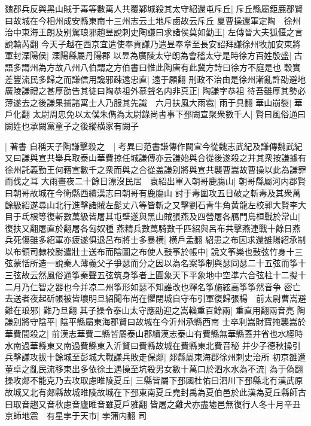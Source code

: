 魏郡兵反與黑山賊于毒等數萬人共覆鄴城殺其太守紹還屯斥丘|{
	斥丘縣屬鉅鹿郡賢曰故城在今相州成安縣東南十三州志云土地斥鹵故云斥丘}
夏曹操還軍定陶　徐州治中東海王朗及别駕琅邪趙昱說刺史陶謙曰求諸侯莫如勤王|{
	左傳晉大夫狐偃之言說輸芮翻}
今天子越在西京宜遣使奉貢謙乃遣昱奉章至長安詔拜謙徐州牧加安東將軍封溧陽侯|{
	溧陽縣屬丹陽郡}
以昱為廣陵太守朗為會稽太守是時徐方百姓殷盛|{
	古語多謂州為方故八州八伯謂之方伯書曰惟此陶唐有此冀方詩曰徐方不庭是也}
穀實差豐流民多歸之而謙信用讒邪疎遠忠直|{
	遠于願翻}
刑政不治由是徐州漸亂許劭避地廣陵謙禮之甚厚劭告其徒曰陶恭祖外慕聲名内非真正|{
	陶謙字恭祖}
待吾雖厚其勢必薄遂去之後謙果捕諸寓士人乃服其先識　六月扶風大雨雹|{
	雨于具翻}
華山崩裂|{
	華戶化翻}
太尉周忠免以太僕朱儁為太尉錄尚書事下邳闕宣聚衆數千人|{
	賢曰風俗通曰闕姓也承闕黨童子之後縱横家有闕子}


|{
	著書}
自稱天子陶謙擊殺之　|{
	考異曰范書謙傳作闕宣今從魏志武紀及謙傳魏武紀又曰謙與宣共舉兵取泰山華費掠任城謙傳亦云謙始與合從後遂殺之并其衆按謙據有徐州託義勤王何藉宣數千之衆而與之合從盖謙别將與宣共襲曹嵩故曹操以此為謙罪而伐之耳}
大雨晝夜二十餘日漂沒民居　袁紹出軍入朝哥鹿膓山|{
	朝哥縣屬河内郡賢曰朝哥故城在今衛縣西續漢志曰朝哥有鹿膓山}
討于毒圍攻五日破之斬毒及其衆萬餘級紹遂尋山北行進擊諸賊左髭丈八等皆斬之又擊劉石青牛角黄龍左校郭大賢李大目于氐根等復斬數萬級皆屠其屯壁遂與黑山賊張燕及四營屠各鴈門烏桓戰於常山|{
	復扶又翻屠直於翻屠各匈奴種}
燕精兵數萬騎數千匹紹與呂布共擊燕連戰十餘日燕兵死傷雖多紹軍亦疲遂俱退呂布將士多暴横|{
	横戶孟翻}
紹患之布因求還雒陽紹承制以布領司隸校尉遣壯士送布而陰圖之布使人鼓筝於帳中|{
	說文筝樂也鼔弦竹身十三弦蒙恬所造一說秦人薄義父子爭瑟而分之因以為名案筝制與瑟同瑟二十五弦而筝十三弦故云然風俗通筝秦聲五弦筑身筝者上圓象天下平象地中空凖六合弦柱十二擬十二月乃仁智之器也今并凉二州筝形如瑟不知誰改也釋名筝施絃高筝筝然音争}
密亡去送者夜起斫帳被皆壞明旦紹聞布尚在懼閉城自守布引軍復歸張楊　前太尉曹嵩避難在琅邪|{
	難乃旦翻}
其子操令泰山太守應劭迎之嵩輜重百餘兩|{
	重直用翻兩音亮}
陶謙别將守陰平|{
	陰平縣屬東海郡賢曰故城在今沂州承縣西南}
士卒利嵩財寶掩襲嵩於華費間殺之|{
	前漢志華費二縣皆屬泰山郡續漢志泰山有費縣無華縣蓋并省也水經時水南過華縣東又南過費縣東入沂賢曰費縣故城在費縣東北費音秘}
并少子德秋操引兵擊謙攻拔十餘城至彭城大戰謙兵敗走保郯|{
	郯縣屬東海郡徐州刺史治所}
初京雒遭董卓之亂民流移東出多依徐土遇操至坑殺男女數十萬口於泗水水為不流|{
	為于偽翻}
操攻郯不能克乃去攻取慮睢陵夏丘|{
	三縣皆屬下邳國杜佑曰泗川下邳縣北冇漢武原故城又北有郯縣故城睢陵故城在下邳東南夏丘堯封禹為夏伯邑於此漢為夏丘縣師古曰取音趨又音秋慮音廬睢音雖夏戶雅翻}
皆屠之雞犬亦盡墟邑無復行人冬十月辛丑京師地震　有星孛于天市|{
	孛蒲内翻}
司


